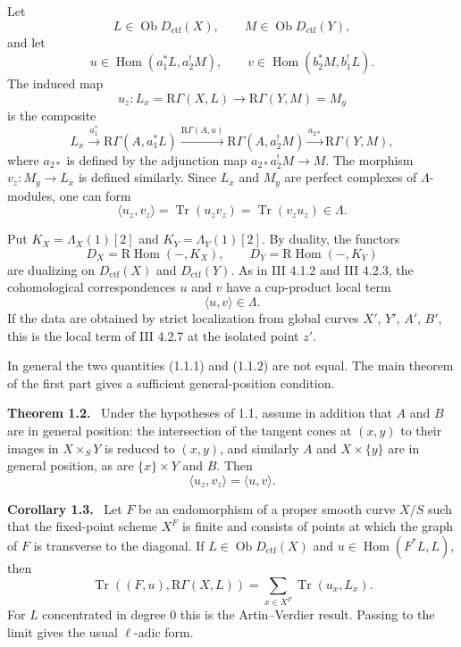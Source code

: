 \documentclass[12pt]{article}
\newcommand{\Hom}{\operatorname{Hom}}
\newcommand{\Tr}{\operatorname{Tr}}
\newcommand{\ob}{\operatorname{Ob}}
\newcommand{\R}{\mathrm R}
\newenvironment{statement}[1]{\par\medskip\noindent\textbf{#1.}\ }{\par\medskip}
\begin{document}
Let
\[
   L\in\ob D_{\mathrm{ctf}}(X),\qquad
   M\in\ob D_{\mathrm{ctf}}(Y),
\]
and let
\[
   u\in\Hom(a_1^*L,a_2^!M),
   \qquad
   v\in\Hom(b_2^*M,b_1^!L).
\]
The induced map
\[
   u_z:L_x=\R\Gamma(X,L)\to \R\Gamma(Y,M)=M_y
\]
is the composite
\[
L_x\xrightarrow{a_1^*}\R\Gamma(A,a_1^*L)
\xrightarrow{\R\Gamma(A,u)}\R\Gamma(A,a_2^!M)
\xrightarrow{a_{2*}}\R\Gamma(Y,M),
\]
where $a_{2*}$ is defined by the adjunction map $a_{2*}a_2^!M\to M$. The morphism $v_z:M_y\to L_x$ is defined similarly. Since $L_x$ and $M_y$ are perfect complexes of $\Lambda$-modules, one can form
\begin{equation}
   \langle u_z,v_z\rangle=
   \Tr(u_zv_z)=\Tr(v_zu_z)\in\Lambda.
   \tag{1.1.1}
\end{equation}

Put $K_X=\Lambda_X(1)[2]$ and $K_Y=\Lambda_Y(1)[2]$. By duality, the functors
\[
   D_X=\R\Hom(-,K_X),
   \qquad
   D_Y=\R\Hom(-,K_Y)
\]
are dualizing on $D_{\mathrm{ctf}}(X)$ and $D_{\mathrm{ctf}}(Y)$. As in III 4.1.2 and III 4.2.3, the cohomological correspondences $u$ and $v$ have a cup-product local term
\begin{equation}
   \langle u,v\rangle\in\Lambda.
   \tag{1.1.2}
\end{equation}
If the data are obtained by strict localization from global curves $X'$, $Y'$, $A'$, $B'$, this is the local term of III 4.2.7 at the isolated point $z'$.

In general the two quantities (1.1.1) and (1.1.2) are not equal. The main theorem of the first part gives a sufficient general-position condition.

\begin{statement}{Theorem 1.2}
Under the hypotheses of 1.1, assume in addition that $A$ and $B$ are in general position: the intersection of the tangent cones at $(x,y)$ to their images in $X\times_S Y$ is reduced to $(x,y)$, and similarly $A$ and $X\times\{y\}$ are in general position, as are $\{x\}\times Y$ and $B$. Then
\begin{equation}
   \langle u_z,v_z\rangle=\langle u,v\rangle.
   \tag{1.2.1}
\end{equation}
\end{statement}

\begin{statement}{Corollary 1.3}
Let $F$ be an endomorphism of a proper smooth curve $X/S$ such that the fixed-point scheme $X^F$ is finite and consists of points at which the graph of $F$ is transverse to the diagonal. If $L\in\ob D_{\mathrm{ctf}}(X)$ and $u\in\Hom(F^*L,L)$, then
\[
   \Tr((F,u),\R\Gamma(X,L))=
   \sum_{x\in X^F}\Tr(u_x,L_x).
\]
For $L$ concentrated in degree $0$ this is the Artin--Verdier result. Passing to the limit gives the usual $\ell$-adic form.
\end{statement}
\end{document}

